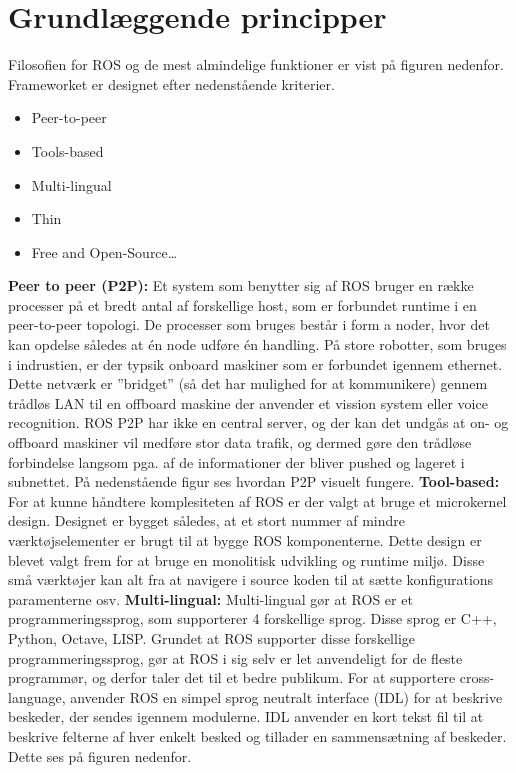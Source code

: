 \section{Grundlæggende principper}
Filosofien for ROS og de mest almindelige funktioner er vist på figuren nedenfor.
Frameworket er designet efter nedenstående kriterier. 
\begin{itemize}  
\item Peer-to-peer
\item Tools-based 
\item Multi-lingual
\item Thin
\item Free and Open-Source\ldots 
\end{itemize}
\textbf{Peer to peer (P2P):} Et system som benytter sig af ROS bruger en række processer på et bredt antal af forskellige host, som er forbundet runtime i en peer-to-peer topologi. De processer som bruges består i form a noder, hvor det kan opdelse således at én node udføre én handling. På store robotter, som bruges i indrustien, er der typsik onboard maskiner som er forbundet igennem ethernet. Dette netværk er ''bridget'' (så det har mulighed for at kommunikere) gennem trådløs LAN til en offboard maskine der anvender et vission system eller voice recognition. ROS P2P har ikke en central server, og der kan det undgås at on- og offboard maskiner vil medføre stor data trafik, og dermed gøre den trådløse forbindelse langsom pga. af de informationer der bliver pushed og lageret i subnettet. På nedenstående figur ses hvordan P2P visuelt fungere. 
\textbf{Tool-based:} For at kunne håndtere komplesiteten af ROS er der valgt at bruge et microkernel design. Designet er bygget således, at et stort nummer af mindre værktøjselementer er brugt til at bygge ROS komponenterne. Dette design er blevet valgt frem for at bruge en monolitisk udvikling og runtime miljø. Disse små værktøjer kan alt fra at navigere i source koden til at sætte konfigurations paramenterne osv.\newline
\newline
\textbf{Multi-lingual:} Multi-lingual gør at ROS er et programmeringssprog, som supporterer 4 forskellige sprog. Disse sprog er C++, Python, Octave, LISP. Grundet at ROS supporter disse forskellige programmeringssprog, gør at ROS i sig selv er let anvendeligt for de fleste programmør, og derfor taler det til et bedre publikum. For at supportere cross-language, anvender ROS en simpel sprog neutralt interface (IDL) for at beskrive beskeder, der sendes igennem modulerne. IDL anvender en kort tekst fil til at beskrive felterne af hver enkelt besked og tillader en sammensætning af beskeder. Dette ses på figuren nedenfor.
